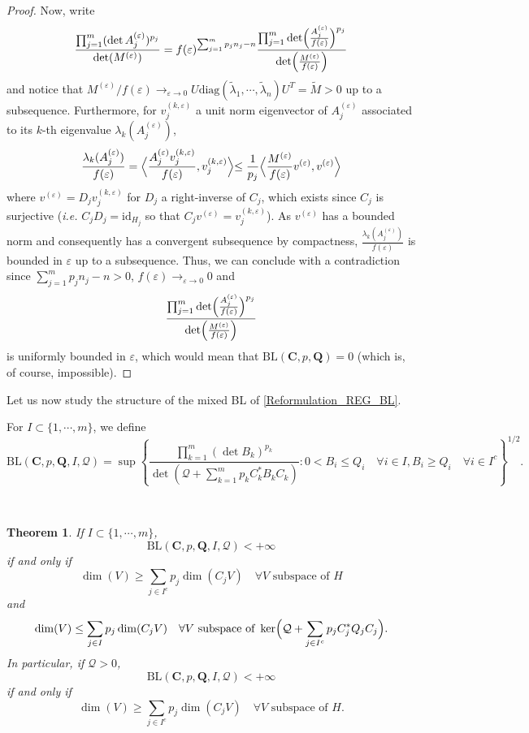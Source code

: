 \documentclass[11pt,a4paper,reqno]{amsart}
\numberwithin{equation}{section}
\newtheorem{theorem}{Theorem}[section]
\theoremstyle{definition}
\newcommand{\ds}{\displaystyle}
\renewcommand{\tilde}{\widetilde}
\newcommand{\<}{\ensuremath \leq}
\renewcommand{\>}{\ensuremath \geq}
\renewcommand{\epsilon}{\varepsilon}
\renewcommand{\tilde}{\widetilde}
\begin{document}
\begin{proof}
Now, write $$\ds \frac{\prod_{j=1}^m (\det A_j^{(\epsilon)})^{p_j}}{\det(M^{(\epsilon)})}=f(\epsilon)^{\sum_{j=1}^m p_jn_j-n}\frac{\prod_{j=1}^m \det \Bigl(\frac{A_j^{(\epsilon)}}{f(\epsilon)} \Bigl)^{p_j}}{\det \Bigl( \frac{M^{(\epsilon)}}{f(\epsilon)}\Bigl)}$$ and notice that $M^{(\epsilon)}/f(\epsilon) \rightarrow_{\epsilon \rightarrow 0}U\mathrm{diag}(\tilde \lambda_1,\cdots,\tilde \lambda_n)U^T=\tilde M>0$ up to a subsequence. Furthermore, for $v_j^{(k,\epsilon)}$ a unit norm eigenvector of $A_j^{(\epsilon)}$ associated to its $k$-th eigenvalue $\lambda_k(A_j^{(\epsilon)})$, $$\frac{\lambda_k(A_j^{(\epsilon)})}{f(\epsilon)}=\Bigl\langle \frac{A_j^{(\epsilon)}v_j^{(k,\epsilon)}}{f(\epsilon)},v_j^{(k,\epsilon)}\Bigl\rangle \leq \frac{1}{p_j} \Bigl\langle \frac{M^{(\epsilon)}}{f(\epsilon)}v^{(\epsilon)},v^{(\epsilon)} \Bigl\rangle$$ where $v^{(\epsilon)}=D_jv_j^{(k,\epsilon)}$ for $D_j$ a right-inverse of $C_j$, which exists since $C_j$ is surjective (\textit{i.e.} $C_jD_j=\mathrm{id}_{H_j}$ so that $C_jv^{(\epsilon)}=v_j^{(k,\epsilon)}$). As $v^{(\epsilon)}$ has a bounded norm and consequently has a convergent subsequence by compactness, $\frac{\lambda_k(A_j^{(\epsilon)})}{f(\epsilon)}$ is bounded in $\epsilon$ up to a subsequence. Thus, we can conclude with a contradiction since $\sum_{j=1}^m p_jn_j-n>0$, $f(\epsilon) \rightarrow_{\epsilon \rightarrow 0} 0$ and $$\frac{\prod_{j=1}^m \det\Bigl( \frac{A_j^{(\epsilon)}}{f(\epsilon)}\Bigl)^{p_j}}{\det \Bigl( \frac{M^{(\epsilon)}}{f(\epsilon)}\Bigl)}$$ is uniformly bounded in $\epsilon$, which would mean that $\mathrm{BL}(\textbf{C},p,\textbf{Q})=0$ (which is, of course, impossible).  
\end{proof}


Let us now study the structure of the mixed BL of \cref{Reformulation_REG_BL}. 

For $I \subset \{1,\cdots,m\}$, we define $$\mathrm{BL}(\mathbf{C},p,\mathbf{Q},I,\mathcal Q)=\sup \left\{ \frac{\prod_{k=1}^m (\det B_k)^{p_k}}{\det(\mathcal Q+\sum_{k=1}^m p_kC_k^*B_kC_k)} : 0<B_i \le Q_i \quad \forall i \in I, B_i \ge Q_i \quad \forall i \in I^c\right\}^{1/2}.$$ 

\hfill \\


\begin{theorem}
If $I \subset \{1,\cdots,m\}$, $$\mathrm{BL}(\mathbf{C},p,\mathbf{Q},I,\mathcal Q)<+\infty$$ if and only if $$\dim(V) \ge \sum_{j \in I^c}p_j\dim(C_jV) \quad \forall V \text{ subspace of } H$$ and $$\dim(V) \le \sum_{j \in I}p_j\dim(C_jV) \quad \forall V \text{ subspace of } \ker \Bigl(\mathcal Q+\sum_{j \in I^c}p_jC_j^*Q_jC_j \Bigl).$$
In particular, if $\mathcal{Q}>0$, $$\mathrm{BL}(\textbf{C},p,\textbf{Q},I,\mathcal Q)<+\infty$$ if and only if $$\dim(V) \ge \sum_{j \in I^c}p_j\dim(C_jV) \quad \forall V \text{ subspace of } H.$$
\end{theorem}
\end{document}
